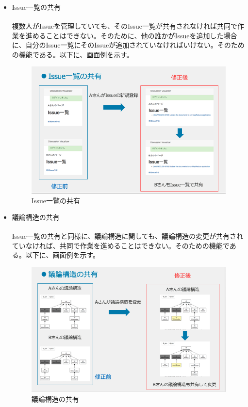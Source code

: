 \documentclass[12pt, oneside]{jreport}
\begin{document}
\begin{itemize}
			\item Issue一覧の共有
			\\ \\
			複数人がIssueを管理していても、そのIssue一覧が共有されなければ共同で作業を進めることはできない。そのために、他の誰かがIssueを追加した場合に、自分のIssue一覧にそのIssueが追加されていなければいけない。そのための機能である。以下に、画面例を示す。
			
			\begin{figure}[H]
			\centering
			\includegraphics[width=17cm,bb=200 300 -200 27]{IssueListShare.png}
			\caption{Issue一覧の共有}
			\end{figure}
		
			\item 議論構造の共有
			\\ \\
			Issue一覧の共有と同様に、議論構造に関しても、議論構造の変更が共有されていなければ、共同で作業を進めることはできない。そのための機能である。以下に、画面例を示す。
			
			\begin{figure}[H]
			\centering
			\includegraphics[width=17cm,bb=200 300 -200 27]{GraphShare.png}
			\caption{議論構造の共有}
			\end{figure}
			
		\end{itemize}
		
\end{document}
